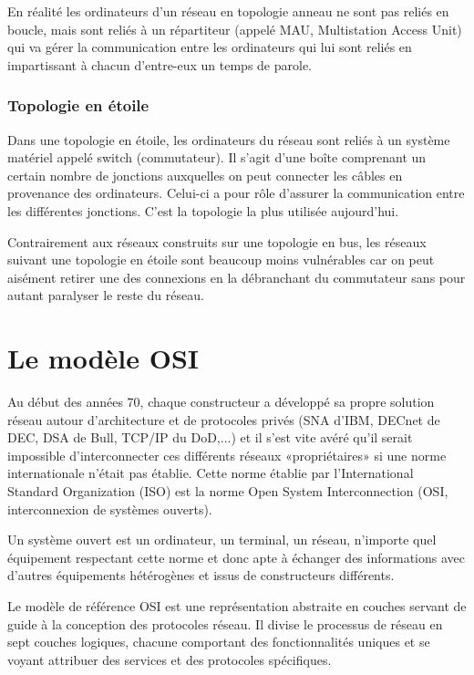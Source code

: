 \documentclass[11pt]{article}
\begin{document}
En réalité les ordinateurs d'un réseau en topologie anneau ne sont pas reliés en boucle, mais sont reliés à un répartiteur (appelé MAU, Multistation Access Unit) qui va gérer la communication entre les ordinateurs qui lui sont reliés en impartissant à chacun d'entre-eux un temps de parole.

\subsubsection{Topologie en étoile}
Dans une topologie en étoile, les ordinateurs du réseau sont reliés à un système matériel appelé switch (commutateur). Il s'agit d'une boîte comprenant un certain nombre de jonctions auxquelles on peut connecter les câbles en provenance des ordinateurs. Celui-ci a pour rôle d'assurer la communication entre les différentes jonctions.
C'est la topologie la plus utilisée aujourd'hui.

Contrairement aux réseaux construits sur une topologie en bus, les réseaux suivant une topologie en étoile sont beaucoup moins vulnérables car on peut aisément retirer une des connexions en la débranchant du commutateur sans pour autant paralyser le reste du réseau.

\section{Le modèle OSI}
Au début des années 70, chaque constructeur a développé sa propre solution réseau autour d'architecture et de protocoles privés (SNA d'IBM, DECnet de DEC, DSA de Bull, TCP/IP du DoD,...) et il s'est vite avéré qu'il serait impossible d'interconnecter ces différents réseaux «propriétaires» si une norme internationale n'était pas établie. Cette norme établie par l'International Standard Organization (ISO) est la norme Open System Interconnection (OSI, interconnexion de systèmes ouverts).

Un système ouvert est un ordinateur, un terminal, un réseau, n'importe quel équipement respectant cette norme et donc apte à échanger des informations avec d'autres équipements hétérogènes et issus de constructeurs différents.

Le modèle de référence OSI est une représentation abstraite en couches servant de guide à la conception des protocoles réseau. Il divise le processus de réseau en sept couches logiques, chacune comportant des fonctionnalités uniques et se voyant attribuer des services et des protocoles spécifiques.
\end{document}
